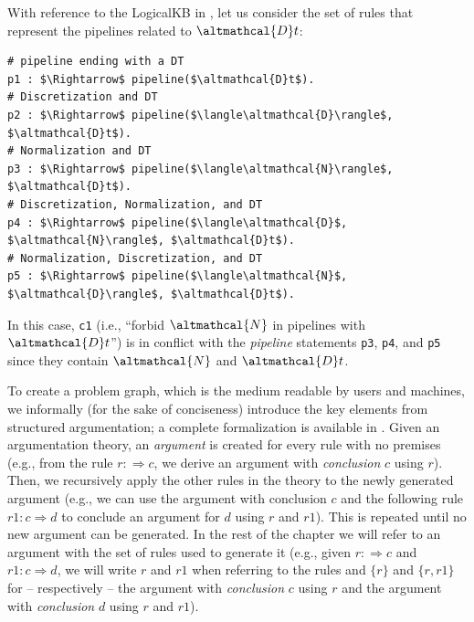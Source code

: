 \begin{example}
With reference to the LogicalKB in , let us consider the set of rules that represent the pipelines related to $\altmathcal{D}t$:
\begin{lstlisting}[mathescape=true]
# pipeline ending with a DT
p1 : $\Rightarrow$ pipeline($\altmathcal{D}t$).
# Discretization and DT
p2 : $\Rightarrow$ pipeline($\langle\altmathcal{D}\rangle$, $\altmathcal{D}t$).
# Normalization and DT
p3 : $\Rightarrow$ pipeline($\langle\altmathcal{N}\rangle$, $\altmathcal{D}t$).
# Discretization, Normalization, and DT
p4 : $\Rightarrow$ pipeline($\langle\altmathcal{D}$, $\altmathcal{N}\rangle$, $\altmathcal{D}t$).
# Normalization, Discretization, and DT
p5 : $\Rightarrow$ pipeline($\langle\altmathcal{N}$, $\altmathcal{D}\rangle$, $\altmathcal{D}t$).
\end{lstlisting}
In this case, \texttt{c1} (i.e., ``forbid $\altmathcal{N}$ in pipelines with $\altmathcal{D}t$'') is in conflict with the \emph{pipeline} statements \texttt{p3}, \texttt{p4}, and \texttt{p5} since they contain $\altmathcal{N}$ and $\altmathcal{D}t$.
\label{ex:conflict}
\end{example}

To create a problem graph, which is the medium readable by users and machines, we informally (for the sake of conciseness) introduce the key elements from structured argumentation; a complete formalization is available in \cite{Modgil2014aspic+}.
Given an argumentation theory, an \emph{argument} is created for every rule with no premises (e.g., from the rule $r : \Rightarrow c$, we derive an argument with \emph{conclusion} $c$ using $r$).
Then, we recursively apply the other rules in the theory to the newly generated argument (e.g., we can use the argument with conclusion $c$ and the following rule $r1 : c \Rightarrow d$ to conclude an argument for $d$ using $r$ and $r1$).
This is repeated until no new argument can be generated.
In the rest of the chapter we will refer to an argument with the set of rules used to generate it (e.g., given $r : \Rightarrow c$ and $r1 : c \Rightarrow d$, we will write $r$ and $r1$ when referring to the rules and $\{r\}$ and $\{r, r1\}$ for -- respectively -- the argument with \emph{conclusion} $c$ using $r$ and the argument with \emph{conclusion} $d$ using $r$ and $r1$).


